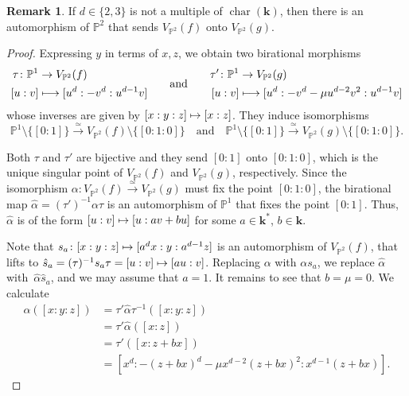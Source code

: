 \documentclass[JEP,XML,SOM,Unicode,NoFloatCountersInSection,published]{cedram}
\newcommand\mto{\mathchoice{\longmapsto}{\mapsto}{\mapsto}{\mapsto}}
\newcommand\quand{\quad\text{and}\quad}
\newcommand\qquand{\qquad\text{and}\qquad}
\theoremstyle{definition}
\newtheorem{remark}[lemma]{Remark}
\newcommand\iso{\stackrel{\simeq}{\longrightarrow}}
\renewcommand\k{{\mathbf k}}
\newcommand\p{{\mathbb P}}\let\PP\p
\newcommand{\kk}{\mathbf{k}}
\DeclareMathOperator{\car}{char}
\begin{document}
\begin{remark}
If $d \in \{2, 3\}$ is not a multiple of $\car(\kk)$, then
there is an automorphism of $\PP^2$ that sends $V_{\PP^2}(f)$ onto $V_{\PP^2}(g)$.
\end{remark}

\begin{proof}
Expressing $y$ in terms of $x,z$, we obtain two birational morphisms
\[
\begin{aligned}
\tau\colon \p^1 & \to V_{\p^2}(f)\\
 {[u:v]} & \mto [u^d:-v^d:u^{d-1}v]
\end{aligned}\qquand
\begin{aligned}
\tau'\colon \p^1 & \to V_{\p^2}(g)\\
{[u:v]} & \mto [u^d:-v^d-\mu u^{d-2}v^2:u^{d-1}v]
\end{aligned}
\]
whose inverses are given by $[x:y:z]\mto [x:z]$. They induce isomorphisms
\[
\p^1\setminus \{[0:1]\}\iso V_{\p^2}(f)\setminus \{[0:1:0]\}\quand\p^1\setminus \{[0:1]\}\iso V_{\p^2}(g)\setminus \{[0:1:0]\}.
\]

Both $\tau$ and $\tau'$ are bijective and they send $[0:1]$ onto $[0:1:0]$, which is the unique singular point of $V_{\p^{2}}(f)$ and $V_{\p^{2}}(g)$,
respectively. Since the isomorphism $\alpha\colon V_{\p^{2}}(f)\iso V_{\p^{2}}(g)$ must fix the point $[0:1:0]$, the birational map $\hat\alpha=(\tau')^{-1}\alpha\tau$ is an automorphism of $\p^1$ that fixes the point $[0:1]$. Thus, $\hat\alpha$ is of the form $[u:v]\mto [u:av+bu]$ for some $a\in \k^*$, $b\in \k$.

Note that $s_a\colon [x:y:z]\mto [a^d x:y:a^{d-1} z]$ is an automorphism of $V_{\p^2}(f)$, that lifts to $\hat s_a=(\tau)^{-1}s_a\tau=[u:v]\mto [a u:v]$. Replacing $\alpha$ with $\alpha s_a$, we replace $\hat\alpha$ with~$\hat\alpha \hat s_a$,
and we may assume that $a=1$. It remains to see that $b=\mu=0$.
We calculate
\begin{align*}
\alpha( [x:y:z]) &= \tau' \hat\alpha \tau^{-1}( [x:y:z])\\
&= \tau' \hat\alpha([x:z]) \\
&= \tau' ([x:z+bx]) \\
&= [x^d:-(z+bx)^d-\mu x^{d-2}(z+bx)^2:x^{d-1}(z+bx)].
\end{align*}


\end{proof}
\end{document}
